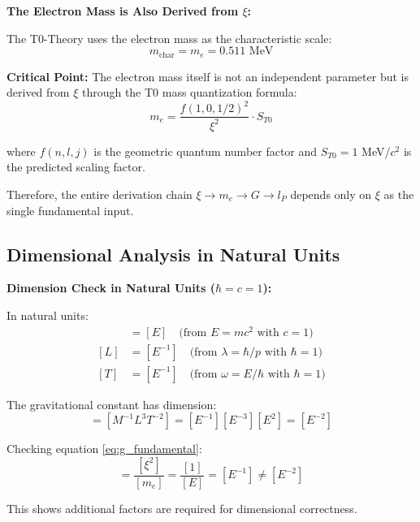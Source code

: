 \documentclass[12pt,a4paper]{article}
\begin{document}
	\begin{insight}
		\textbf{The Electron Mass is Also Derived from $\xi$:}
		
		The T0-Theory uses the electron mass as the characteristic scale:
		\begin{equation}
			m_{\text{char}} = m_e = 0.511 \text{ MeV}
			\label{eq:characteristic_mass}
		\end{equation}
		
		\textbf{Critical Point:} The electron mass itself is not an independent parameter but is derived from $\xi$ through the T0 mass quantization formula:
		\begin{equation}
			m_e = \frac{f(1,0,1/2)^2}{\xi^2} \cdot S_{T0}
		\end{equation}
		
		where $f(n,l,j)$ is the geometric quantum number factor and $S_{T0} = 1$ MeV/$c^2$ is the predicted scaling factor.
		
		Therefore, the entire derivation chain $\xi \to m_e \to G \to l_P$ depends only on $\xi$ as the single fundamental input.
	\end{insight}
	
	\subsection{Dimensional Analysis in Natural Units}
	
	\begin{derivation}
		\textbf{Dimension Check in Natural Units ($\hbar = c = 1$):}
		
		In natural units:
		\begin{align}
			[M] &= [E] \quad \text{(from } E = mc^2 \text{ with } c = 1\text{)} \\
			[L] &= [E^{-1}] \quad \text{(from } \lambda = \hbar/p \text{ with } \hbar = 1\text{)} \\
			[T] &= [E^{-1}] \quad \text{(from } \omega = E/\hbar \text{ with } \hbar = 1\text{)}
		\end{align}
		
		The gravitational constant has dimension:
		\begin{equation}
			[G] = [M^{-1}L^3T^{-2}] = [E^{-1}][E^{-3}][E^2] = [E^{-2}]
		\end{equation}
		
		Checking equation \eqref{eq:g_fundamental}:
		\begin{equation}
			[G] = \frac{[\xi^2]}{[m_e]} = \frac{[1]}{[E]} = [E^{-1}] \neq [E^{-2}]
		\end{equation}
		
		This shows additional factors are required for dimensional correctness.
	\end{derivation}
	
\end{document}
